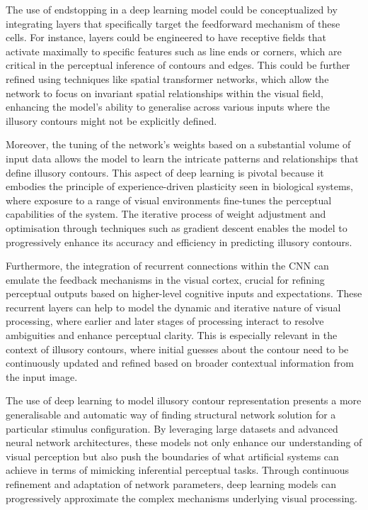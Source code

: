 \documentclass[12pt]{article}
\begin{document}
The use of endstopping in a deep learning model could be conceptualized by integrating layers that specifically target the feedforward mechanism of these cells. For instance, layers could be engineered to have receptive fields that activate maximally to specific features such as line ends or corners, which are critical in the perceptual inference of contours and edges. This could be further refined using techniques like spatial transformer networks, which allow the network to focus on invariant spatial relationships within the visual field, enhancing the model's ability to generalise across various inputs where the illusory contours might not be explicitly defined.

Moreover, the tuning of the network's weights based on a substantial volume of input data allows the model to learn the intricate patterns and relationships that define illusory contours. This aspect of deep learning is pivotal because it embodies the principle of experience-driven plasticity seen in biological systems, where exposure to a range of visual environments fine-tunes the perceptual capabilities of the system. The iterative process of weight adjustment and optimisation through techniques such as gradient descent enables the model to progressively enhance its accuracy and efficiency in predicting illusory contours.

Furthermore, the integration of recurrent connections within the CNN can emulate the feedback mechanisms in the visual cortex, crucial for refining perceptual outputs based on higher-level cognitive inputs and expectations. These recurrent layers can help to model the dynamic and iterative nature of visual processing, where earlier and later stages of processing interact to resolve ambiguities and enhance perceptual clarity. This is especially relevant in the context of illusory contours, where initial guesses about the contour need to be continuously updated and refined based on broader contextual information from the input image.

The use of deep learning to model illusory contour representation presents a more generalisable and automatic way of finding structural network solution for a particular stimulus configuration. By leveraging large datasets and advanced neural network architectures, these models not only enhance our understanding of visual perception but also push the boundaries of what artificial systems can achieve in terms of mimicking inferential perceptual tasks. Through continuous refinement and adaptation of network parameters, deep learning models can progressively approximate the complex mechanisms underlying visual processing.
\end{document}
